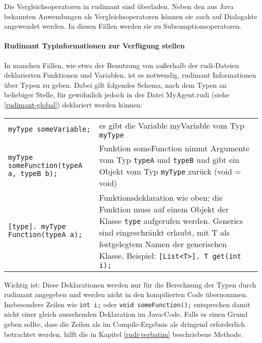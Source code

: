 Die Vergleichsoperatoren in rudimant sind überladen. Neben den aus Java bekannten Anwendungen als Vergleichsoperatoren können sie auch auf Dialogakte angewendet werden. In diesen Fällen werden sie zu Subsumptionsoperatoren.

\paragraph{Rudimant Typinformationen zur Verfügung stellen}

In manchen Fällen, wie etwa der Benutzung von außerhalb der rudi-Dateien
deklarierten Funktionen und Variablen, ist es notwendig, rudimant Informationen
über Typen zu geben. Dabei gilt folgendes Schema, nach dem Typen an beliebiger
Stelle, für gewöhnlich jedoch in der Datei MyAgent.rudi (siehe
\ref{rudimant-global}) deklariert werden können:\\
\vspace*{2ex}
\noindent
\begin{tabular}{ll}
\texttt{myType someVariable;}
 &  es gibt die Variable myVariable vom Typ \texttt{myType} \\
    
\texttt{myType someFunction(typeA a, typeB b);} &  Funktion someFunction nimmt Argumente vom Typ \texttt{typeA} und \texttt{typeB} und gibt ein Objekt vom Typ \texttt{myType} zurück (void = void) \\
    
\texttt{[type]. myType Function(typeA a);} & Funktionsdeklaration wie oben; die Funktion muss auf einem Objekt der Klasse \texttt{type} aufgerufen werden. Generics sind eingeschränkt erlaubt, mit T als festgelegtem Namen der generischen Klasse, Beispiel: \texttt{[List<T>]. T get(int i);}
\end{tabular}

Wichtig ist: Diese Deklarationen werden nur für die Berechnung der Typen durch rudimant angegeben und werden nicht in den kompilierten Code übernommen. Insbesondere Zeilen wie \texttt{int i;} oder \texttt{void someFunction();} entsprechen damit nicht einer gleich aussehenden Deklaration im Java-Code. Falls es einen Grund geben sollte, dass die Zeilen als im Compile-Ergebnis als dringend erforderlich betrachtet werden, hilft die in Kapitel \ref{rudi-verbatim} beschriebene Methode.


